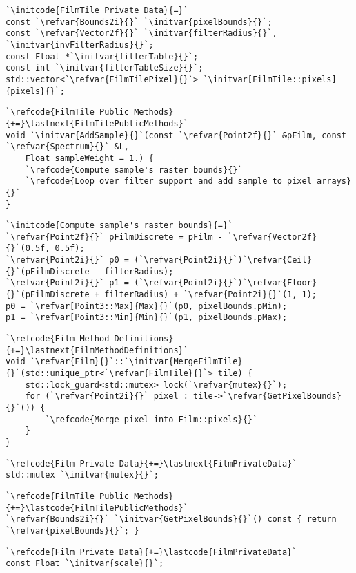 \begin{lstlisting}
`\initcode{FilmTile Private Data}{=}`
const `\refvar{Bounds2i}{}` `\initvar{pixelBounds}{}`;
const `\refvar{Vector2f}{}` `\initvar{filterRadius}{}`, `\initvar{invFilterRadius}{}`;
const Float *`\initvar{filterTable}{}`;
const int `\initvar{filterTableSize}{}`;
std::vector<`\refvar{FilmTilePixel}{}`> `\initvar[FilmTile::pixels]{pixels}{}`;
\end{lstlisting}

\begin{lstlisting}
`\refcode{FilmTile Public Methods}{+=}\lastnext{FilmTilePublicMethods}`
void `\initvar{AddSample}{}`(const `\refvar{Point2f}{}` &pFilm, const `\refvar{Spectrum}{}` &L,
    Float sampleWeight = 1.) {
    `\refcode{Compute sample's raster bounds}{}`
    `\refcode{Loop over filter support and add sample to pixel arrays}{}`
}
\end{lstlisting}

\begin{lstlisting}
`\initcode{Compute sample's raster bounds}{=}`
`\refvar{Point2f}{}` pFilmDiscrete = pFilm - `\refvar{Vector2f}{}`(0.5f, 0.5f);
`\refvar{Point2i}{}` p0 = (`\refvar{Point2i}{}`)`\refvar{Ceil}{}`(pFilmDiscrete - filterRadius);
`\refvar{Point2i}{}` p1 = (`\refvar{Point2i}{}`)`\refvar{Floor}{}`(pFilmDiscrete + filterRadius) + `\refvar{Point2i}{}`(1, 1);
p0 = `\refvar[Point3::Max]{Max}{}`(p0, pixelBounds.pMin);
p1 = `\refvar[Point3::Min]{Min}{}`(p1, pixelBounds.pMax);
\end{lstlisting}

\begin{lstlisting}
`\refcode{Film Method Definitions}{+=}\lastnext{FilmMethodDefinitions}`
void `\refvar{Film}{}`::`\initvar{MergeFilmTile}{}`(std::unique_ptr<`\refvar{FilmTile}{}`> tile) {
    std::lock_guard<std::mutex> lock(`\refvar{mutex}{}`);
    for (`\refvar{Point2i}{}` pixel : tile->`\refvar{GetPixelBounds}{}`()) {
        `\refcode{Merge pixel into Film::pixels}{}`
    }
}
\end{lstlisting}
\begin{lstlisting}
`\refcode{Film Private Data}{+=}\lastnext{FilmPrivateData}`
std::mutex `\initvar{mutex}{}`;
\end{lstlisting}
\begin{lstlisting}
`\refcode{FilmTile Public Methods}{+=}\lastcode{FilmTilePublicMethods}`
`\refvar{Bounds2i}{}` `\initvar{GetPixelBounds}{}`() const { return `\refvar{pixelBounds}{}`; }
\end{lstlisting}
\begin{lstlisting}
`\refcode{Film Private Data}{+=}\lastcode{FilmPrivateData}`
const Float `\initvar{scale}{}`;
\end{lstlisting}

